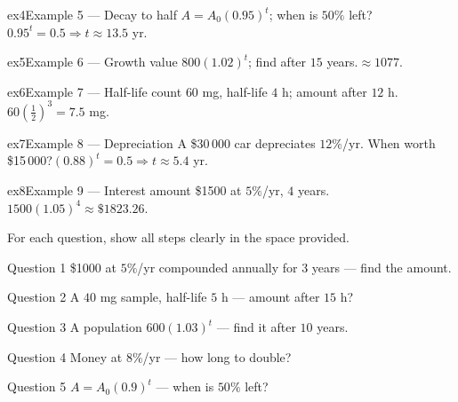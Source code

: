 \documentclass[11pt]{article}
\begin{document}
\begin{example}{ex4}{Example 5 --- Decay to half}
$A=A_0(0.95)^{t}$; when is $50\%$ left?\soln $0.95^t=0.5\Rightarrow t\approx13.5$ yr.
\end{example}

\begin{example}{ex5}{Example 6 --- Growth value}
$800(1.02)^{t}$; find after $15$ years.\soln $\approx1077$.
\end{example}

\begin{example}{ex6}{Example 7 --- Half-life count}
$60$ mg, half-life $4$ h; amount after $12$ h.\soln $60\left(\tfrac12\right)^{3}=7.5$ mg.
\end{example}

\begin{example}{ex7}{Example 8 --- Depreciation}
A \$30\,000 car depreciates $12\%$/yr. When worth \$15\,000?\soln $(0.88)^t=0.5\Rightarrow t\approx5.4$ yr.
\end{example}

\begin{example}{ex8}{Example 9 --- Interest amount}
\$1500 at $5\%$/yr, $4$ years.\soln $1500(1.05)^{4}\approx\$1823.26$.
\end{example}

\clearpage
{}
For each question, show all steps clearly in the space provided.

\begin{qbox}{Question 1}
\$1000 at $5\%$/yr compounded annually for $3$ years — find the amount.\workspace{2.4cm}
\end{qbox}

\begin{qbox}{Question 2}
A $40$ mg sample, half-life $5$ h — amount after $15$ h?\workspace{2.4cm}
\end{qbox}

\begin{qbox}{Question 3}
A population $600(1.03)^{t}$ — find it after $10$ years.\workspace{2.4cm}
\end{qbox}

\begin{qbox}{Question 4}
Money at $8\%$/yr — how long to double?\workspace{2.4cm}
\end{qbox}

\begin{qbox}{Question 5}
$A=A_0(0.9)^{t}$ — when is $50\%$ left?\workspace{2.4cm}
\end{qbox}
\end{document}

